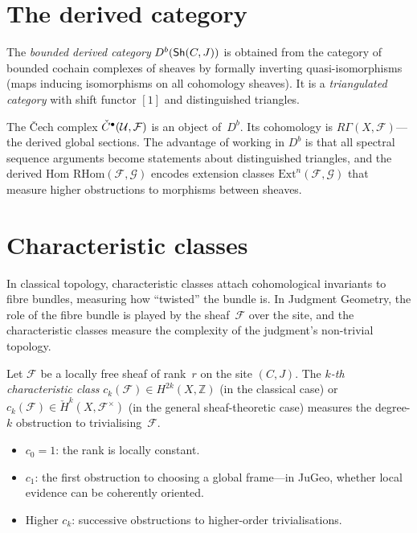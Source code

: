 \section{The derived category}
\label{sec:derived}

\begin{definition}
\label{def:derived}
The \emph{bounded derived category} $D^b(\mathsf{Sh}(C,J))$ is obtained from
the category of bounded cochain complexes of sheaves by formally
inverting quasi-isomorphisms (maps inducing isomorphisms on all
cohomology sheaves).  It is a \emph{triangulated category} with
shift functor $[1]$ and distinguished triangles.
\end{definition}

\begin{remark}
The \v{C}ech complex $\check{C}^\bullet(\mathcal{U}, \mathcal{F})$ is an
object of~$D^b$.  Its cohomology is $R\Gamma(X, \mathcal{F})$---the
derived global sections.  The advantage of working in $D^b$ is that all
spectral sequence arguments become statements about distinguished
triangles, and the derived Hom
$\mathrm{RHom}(\mathcal{F}, \mathcal{G})$ encodes extension classes
$\mathrm{Ext}^n(\mathcal{F}, \mathcal{G})$ that measure higher
obstructions to morphisms between sheaves.
\end{remark}

\section{Characteristic classes}
\label{sec:char-classes}

In classical topology, characteristic classes attach cohomological
invariants to fibre bundles, measuring how ``twisted'' the bundle is.
In Judgment Geometry, the role of the fibre bundle is played by
the sheaf~$\mathcal{F}$ over the site, and the characteristic classes
measure the complexity of the judgment's non-trivial topology.

\begin{definition}
\label{def:char-class}
Let $\mathcal{F}$ be a locally free sheaf of rank~$r$ on the site
$(C,J)$.  The \emph{$k$-th characteristic class}
$c_k(\mathcal{F}) \in H^{2k}(X, \mathbb{Z})$ (in the classical case)
or $c_k(\mathcal{F}) \in \check{H}^k(X, \mathcal{F}^\times)$ (in
the general sheaf-theoretic case) measures the degree-$k$ obstruction
to trivialising~$\mathcal{F}$.
\begin{itemize}[nosep]
\item $c_0 = 1$: the rank is locally constant.
\item $c_1$: the first obstruction to choosing a global frame---in
  JuGeo, whether local evidence can be coherently oriented.
\item Higher $c_k$: successive obstructions to higher-order
  trivialisations.
\end{itemize}
\end{definition}

